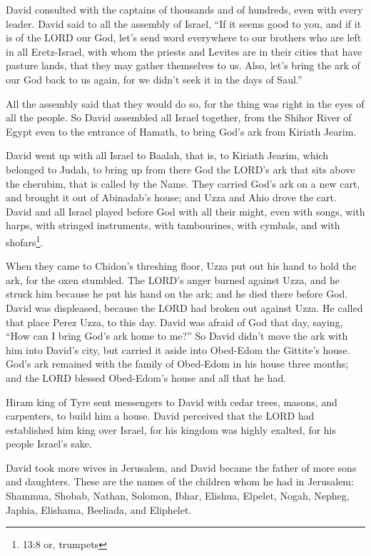 \mychapter{} \myverse*{}David consulted with the captains of thousands and of hundreds,
even with every leader.
\myverse{}David said to all the assembly of Israel, “If it seems good to you, and if
it is of the LORD our God, let’s send word everywhere to our brothers who are left in all Eretz-Israel,
with whom the priests and Levites are in their cities that have pasture lands, that they may gather themselves
to us.
\myverse{}Also, let’s bring the ark of our God back to us again, for we didn’t seek it
in the days of Saul.”

\myverse{}All the assembly said that they would do so, for the thing was
right in the eyes of all the people.
\myverse{}So David assembled all Israel together, from the Shihor River of Egypt even
to the entrance of Hamath, to bring God’s ark from Kiriath Jearim.

\myverse{}David went up with all Israel to Baalah, that is, to Kiriath Jearim,
which belonged to Judah, to bring up from there God the LORD’s ark that sits above the cherubim, that
is called by the Name.
\myverse{}They carried God’s ark on a new cart, and brought it out of Abinadab’s house;
and Uzza and Ahio drove the cart.
\myverse{}David and all Israel played before God with all their might, even with songs,
with harps, with stringed instruments, with tambourines, with cymbals, and with shofars\footnote{13:8 or, trumpets}.

\myverse{}When they came to Chidon’s threshing floor, Uzza put out his hand
to hold the ark, for the oxen stumbled.
\myverse{}The LORD’s anger burned against Uzza, and he struck him because he put his
hand on the ark; and he died there before God.
\myverse{}David was displeased, because the LORD had broken out against Uzza. He called
that place Perez Uzza, to this day.
\myverse{}David was afraid of God that day, saying, “How can I bring God’s ark home
to me?”
\myverse{}So David didn’t move the ark with him into David’s city, but carried it aside
into Obed-Edom the Gittite’s house.
\myverse{}God’s ark remained with the family of Obed-Edom in his house three months;
and the LORD blessed Obed-Edom’s house and all that he had.


\mychapter{} \myverse*{}Hiram king of Tyre sent messengers to David with cedar trees,
masons, and carpenters, to build him a house.
\myverse{}David perceived that the LORD had established him king over Israel, for his
kingdom was highly exalted, for his people Israel’s sake.

\myverse{}David took more wives in Jerusalem, and David became the father
of more sons and daughters.
\myverse{}These are the names of the children whom he had in Jerusalem: Shammua, Shobab,
Nathan, Solomon,
\myverse{}Ibhar, Elishua, Elpelet,
\myverse{}Nogah, Nepheg, Japhia,
\myverse{}Elishama, Beeliada, and Eliphelet.

